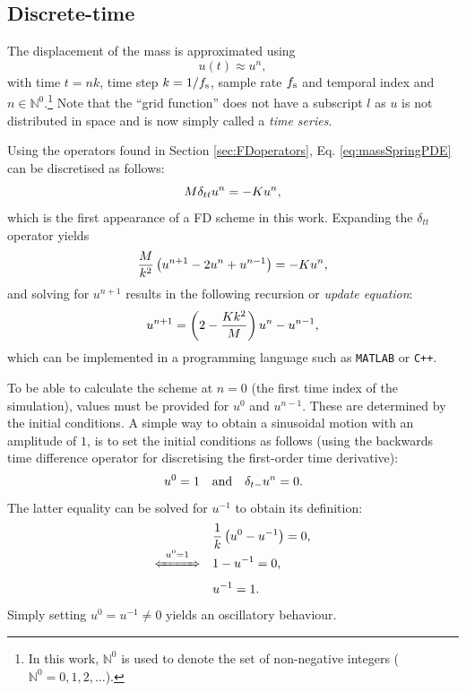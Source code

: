 \subsection{Discrete-time}
The displacement of the mass is approximated using 
\begin{equation}
    u(t) \approx u^n,
\end{equation}
with time $t = nk$, time step $k = 1/f_\text{s}$, sample rate $f_\text{s}$ and temporal index and $n \in \mathbb{N}^0$.\footnote{In this work, $\mathbb{N}^0$ is used to denote the set of non-negative integers ($\mathbb{N}^0 = 0, 1, 2, 
\hdots$).} Note that the ``grid function'' does not have a subscript $l$ as $u$ is not distributed in space and is now simply called a \textit{time series}.

Using the operators found in Section 
\ref{sec:FDoperators}, Eq. \eqref{eq:massSpringPDE} can be discretised as follows:
\begin{equation}\label{eq:massSpringFDS}
    M \delta_{tt} u^n = -Ku^n,
\end{equation}
which is the first appearance of a FD scheme in this work. Expanding the $\delta_{tt}$ operator yields 
\begin{equation*}
    \frac{M}{k^2}\left(u^{n+1}-2u^n+u^{n-1}\right) = -Ku^n,\nonumber
\end{equation*}
and solving for $u^{n+1}$ results in the following recursion or \textit{update equation}:
\begin{equation}\label{eq:massSpringUpdate}
    u^{n+1} = \left(2-\frac{Kk^2}{M} \right)u^n - u^{n-1},
\end{equation}
which can be implemented in a programming language such as \texttt{MATLAB} or \texttt{C++}. %

To be able to calculate the scheme at $n=0$ (the first time index of the simulation), values must be provided for $u^0$ and $u^{n-1}$. These are determined by the initial conditions. A simple way to obtain a sinusoidal motion with an amplitude of $1$, is to set the initial conditions as follows (using the backwards time difference operator for discretising the first-order time derivative): 
%
\begin{equation}
    u^0 = 1 \quad \text{and} \quad \delta_{t-} u^n = 0.
\end{equation}
The latter equality can be solved for $u^{-1}$ to obtain its definition: 
\begin{align*}
    &\frac{1}{k}\left(u^0 - u^{-1}\right) = 0,\\[-1em]
    \xLeftrightarrow{\mystrut\ u^0 = 1\ }\quad &1 - u^{-1} = 0,\\[0.1em]
 &u^{-1} = 1.
\end{align*}
Simply setting $u^0 = u^{-1} \neq 0$  yields an oscillatory behaviour. 

